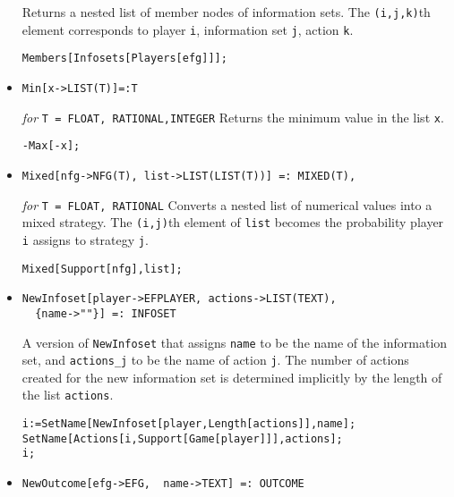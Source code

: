 \begin{itemize}
\bd 
Returns a nested list of member nodes of information sets.  The
\verb+(i,j,k)+th element corresponds to player \verb+i+, information
set \verb+j+, action \verb+k+.  
\begin{verbatim}
Members[Infosets[Players[efg]]];
\end{verbatim} 
\ed

\item{}
\protect \large \begin{verbatim}
Min[x->LIST(T)]=:T
\end{verbatim}\normalsize

{\it for} {\tt T = FLOAT, RATIONAL,INTEGER}
\bd 
Returns the minimum value in the list \verb+x+.  
\begin{verbatim}
-Max[-x];
\end{verbatim} 
\ed

\item{}
\protect \large \begin{verbatim}
Mixed[nfg->NFG(T), list->LIST(LIST(T))] =: MIXED(T),
\end{verbatim}\normalsize

{\it for} {\tt T = FLOAT, RATIONAL}
\bd 
Converts a nested list of numerical values into a mixed strategy.  The
\verb+(i,j)+th element of \verb+list+ becomes the probability
player \verb+i+ assigns to strategy \verb+j+. 
\begin{verbatim}
Mixed[Support[nfg],list];
\end{verbatim} 
\ed

\item{}
\protect \large \begin{verbatim}
NewInfoset[player->EFPLAYER, actions->LIST(TEXT), 
  {name->""}] =: INFOSET
\end{verbatim}\normalsize

\bd 
A version of \verb+NewInfoset+ that assigns \verb+name+ to be the name
of the information set, and \verb+actions_j+ to be the name of action
\verb+j+.  The number of actions created for the new information set
is determined implicitly by the length of the list \verb+actions+.  
\begin{verbatim}
i:=SetName[NewInfoset[player,Length[actions]],name];
SetName[Actions[i,Support[Game[player]]],actions];
i;
\end{verbatim} 
\ed

\item{}
\protect \large \begin{verbatim}
NewOutcome[efg->EFG,  name->TEXT] =: OUTCOME
\end{verbatim}\normalsize


\end{itemize}
